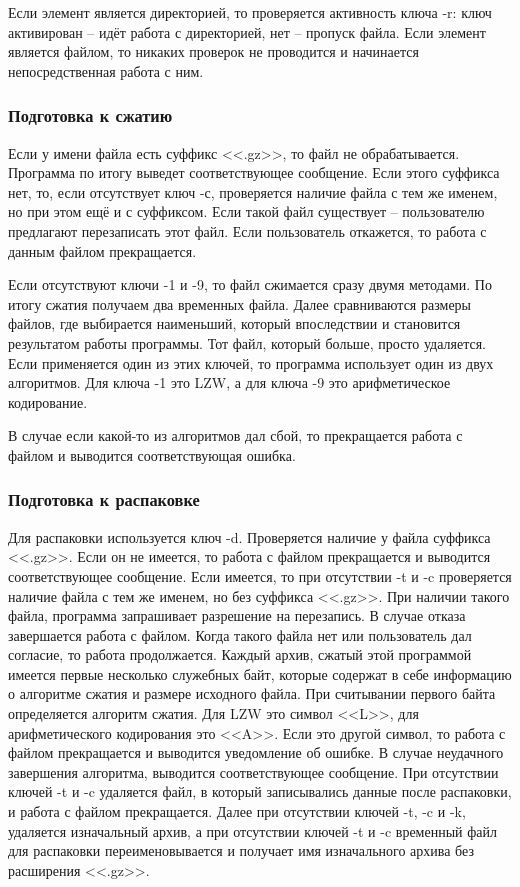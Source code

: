 \documentclass[12pt]{article}
\begin{document}
	Если элемент является директорией, то проверяется активность ключа -r: ключ активирован -- идёт работа с директорией, нет -- пропуск файла. Если элемент является файлом, то никаких проверок не проводится и начинается непосредственная работа с ним.
	
	\subsubsection*{Подготовка к сжатию}
	
	Если у имени файла есть суффикс <<.gz>>, то файл не обрабатывается. Программа по итогу выведет соответствующее сообщение. Если этого суффикса нет, то, если отсутствует ключ -с, проверяется наличие файла с тем же именем, но при этом ещё и с суффиксом. Если такой файл существует -- пользователю предлагают перезаписать этот файл. Если пользователь откажется, то работа с данным файлом прекращается.
	
	Если отсутствуют ключи -1 и -9, то файл сжимается сразу двумя методами. По итогу сжатия получаем два временных файла. Далее сравниваются размеры файлов, где выбирается наименьший, который впоследствии и становится результатом работы программы. Тот файл, который больше, просто удаляется. Если применяется один из этих ключей, то программа использует один из двух алгоритмов. Для ключа -1 это LZW, а для ключа -9 это арифметическое кодирование.
	
	В случае если какой-то из алгоритмов дал сбой, то прекращается работа с файлом и выводится соответствующая ошибка.
	
	\subsubsection*{Подготовка к распаковке}
	
	Для распаковки используется ключ -d. Проверяется наличие у файла суффикса <<.gz>>. Если он не имеется, то работа с файлом прекращается и выводится соответствующее сообщение. Если имеется, то при отсутствии -t и -c проверяется наличие файла с тем же именем, но без суффикса <<.gz>>. При наличии такого файла, программа запрашивает разрешение на перезапись. В случае отказа завершается работа с файлом. Когда такого файла нет или пользователь дал согласие, то работа продолжается. Каждый архив, сжатый этой программой имеется первые несколько служебных байт, которые содержат в себе информацию о алгоритме сжатия и размере исходного файла. При считывании первого байта определяется алгоритм сжатия. Для LZW это символ <<L>>, для арифметического кодирования это <<A>>. Если это другой символ, то работа с файлом прекращается и выводится уведомление об ошибке. В случае неудачного завершения алгоритма, выводится соответствующее сообщение. При отсутствии ключей -t и -c удаляется файл, в который записывались данные после распаковки, и работа с файлом прекращается. Далее при отсутствии ключей -t, -c и -k, удаляется изначальный архив, а при отсутствии ключей -t и -c временный файл для распаковки переименовывается и получает имя изначального архива без расширения <<.gz>>.
	
\end{document}
